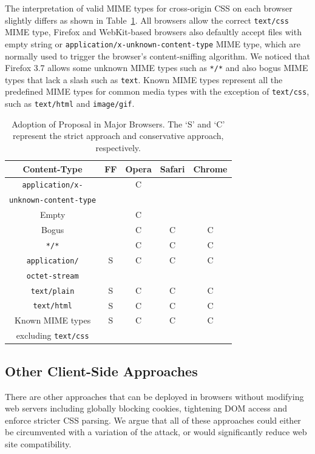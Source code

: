 \documentclass{acm_proc_article-sp}
\begin{document}
The interpretation of valid MIME types for cross-origin CSS on each browser slightly differs as shown in Table~\ref{table:adoption}. All browsers allow the correct \texttt{text/css} MIME type, Firefox and WebKit-based browsers also defaultly accept files with empty string or \texttt{application/x-unknown-content-type} MIME type, which are normally used to trigger the browser's content-sniffing algorithm. We noticed that Firefox 3.7 allows some unknown MIME types such as \texttt{*/*} and also bogus MIME types that lack a slash such as \texttt{text}. Known MIME types represent all the predefined MIME types for common media types with the exception of \texttt{text/css}, such as \texttt{text/html} and \texttt{image/gif}.

\begin{table}
\centering
\begin{tabular}{|c|c|c|c|c|} \hline
Content-Type&FF&Opera&Safari&Chrome\\ \hline
\texttt{application/x-}&&C&&\\ 
\texttt{unknown-content-type}&&&&\\ \hline
Empty&&C&&\\ \hline
Bogus&&C&C&C \\ \hline
\texttt{*/*}&&C&C&C \\ \hline
\texttt{application/}&S&C&C&C\\ 
\texttt{octet-stream}&&&&\\ \hline
\texttt{text/plain}&S&C&C&C\\ \hline
\texttt{text/html}&S&C&C&C\\ \hline
Known MIME types&S&C&C&C\\
excluding \texttt{text/css}&&&&\\
\hline\end{tabular}
\caption{Adoption of Proposal in Major Browsers. The `S' and `C' represent the strict approach and conservative approach, respectively.}
\label{table:adoption}
\end{table}

\subsection{Other Client-Side Approaches}
There are other approaches that can be deployed in browsers without modifying web servers including globally blocking cookies, tightening DOM access and enforce stricter CSS parsing.  We argue that all of these approaches could either be circumvented with a variation of the attack, or would significantly reduce web site compatibility.
\end{document}
